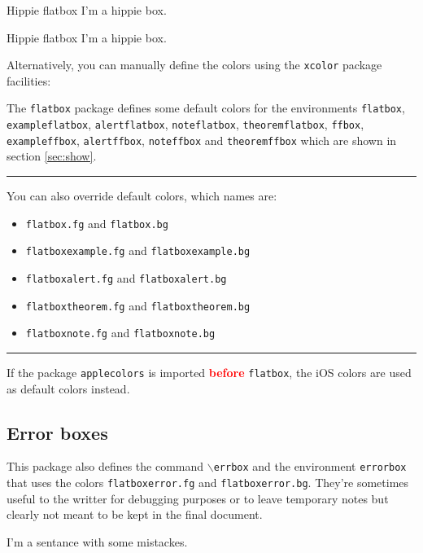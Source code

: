 \documentclass[a4paper]{article}
\newcommand{\dashskip}{%
\begin{center}
  \rule{3em}{.1pt}
\end{center}}
\begin{document}

\begin{flatbox}[hippie]{Hippie flatbox}
I'm a hippie box.
\end{flatbox}

\begin{ffbox}[hippie]{Hippie flatbox}
I'm a hippie box.
\end{ffbox}

\medskip

Alternatively, you can manually define the colors using the \texttt{xcolor}
package facilities:

\begin{latexcode}
\end{latexcode}

\bigskip

The \texttt{flatbox} package defines some default colors for the environments
\texttt{flatbox}, \texttt{exampleflatbox}, \texttt{alertflatbox},
\texttt{noteflatbox}, \texttt{theoremflatbox},
\texttt{ffbox}, \texttt{exampleffbox}, \texttt{alertffbox},
\texttt{noteffbox} and \texttt{theoremffbox} which are shown in section \ref{sec:show}.

\dashskip
You can also override default colors, which names are:
\begin{itemize}
\renewcommand{\line}[1]{\item \texttt{flatbox#1.fg} and \texttt{flatbox#1.bg}}
\line{}
\line{example}
\line{alert}
\line{theorem}
\line{note}
\end{itemize}

\dashskip
If the package \texttt{applecolors} is imported \textcolor{red}{\textbf{before}}
\texttt{flatbox}, the iOS colors are used as default colors instead.

\subsection{Error boxes}
This package also defines the command \texttt{$\backslash$errbox} and the
environment \texttt{errorbox} that uses the colors \texttt{flatboxerror.fg} and
\texttt{flatboxerror.bg}. They're sometimes useful to the writter for debugging
purposes or to leave temporary notes but clearly not meant to be kept in the final
document.

I'm a sentance with some mistackes.
\end{document}
